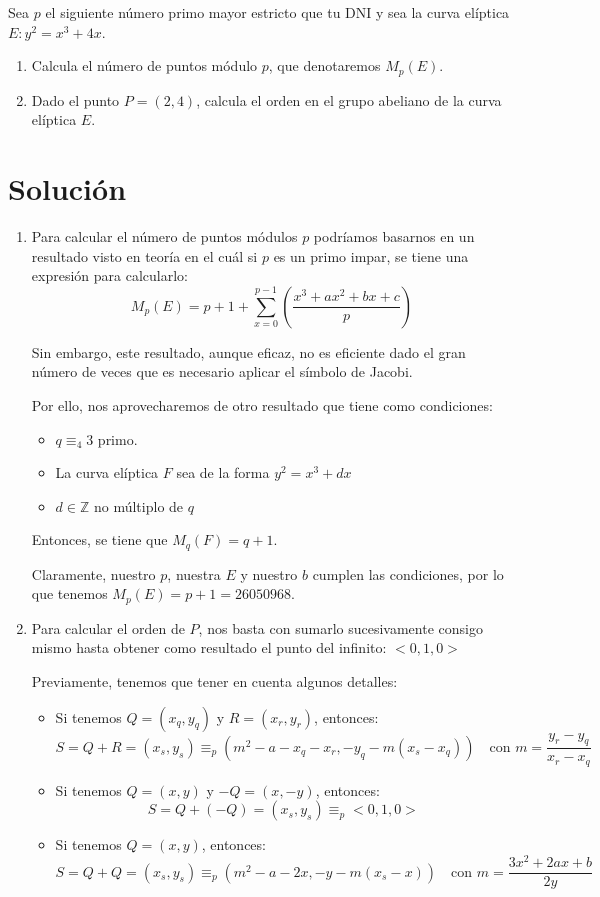 	Sea $p$ el siguiente número primo mayor estricto que tu DNI y sea la curva elíptica $E: y^2 = x^3 + 4x$.
	\begin{enumerate}
		\item Calcula el número de puntos módulo $p$, que denotaremos $M_p(E)$.
		\item Dado el punto $P = (2,4)$, calcula el orden en el grupo abeliano de la curva elíptica $E$.
	\end{enumerate}
	
\section*{Solución}
	\begin{enumerate}
		\item Para calcular el número de puntos módulos $p$ podríamos basarnos en un resultado visto en teoría
		en el cuál si $p$ es un primo impar, se tiene una expresión para calcularlo:
		$$\displaystyle M_p(E) = p + 1 + \sum_{x=0}^{p-1} \left( \frac{x^3 + ax^2 + bx + c}{p} \right)$$
		
		Sin embargo, este resultado, aunque eficaz, no es eficiente dado el gran número de veces que es necesario
		aplicar el símbolo de Jacobi.
		
		Por ello, nos aprovecharemos de otro resultado que tiene como condiciones:
		\begin{itemize}
			\item $q \equiv_4 3$ primo.
			\item La curva elíptica $F$ sea de la forma $y^2 = x^3 + dx$
			\item $d \in \mathbb{Z}$ no múltiplo de $q$
		\end{itemize}
		Entonces, se tiene que $M_q(F) = q+1$.

		Claramente, nuestro $p$, nuestra $E$ y nuestro $b$ cumplen las condiciones, por lo que tenemos $M_p(E)
		= p+1 = 26050968$.
		
		\item Para calcular el orden de $P$, nos basta con sumarlo sucesivamente consigo mismo hasta obtener
		como resultado el punto del infinito: $<0, 1, 0>$
		
		Previamente, tenemos que tener en cuenta algunos detalles:
		\begin{itemize}
			\item Si tenemos $Q = (x_q, y_q)$ y $R = (x_r, y_r)$, entonces:
			$$S = Q + R = (x_s, y_s) \equiv_p (m^2 - a - x_q - x_r, -y_q - m(x_s - x_q)) \quad \text{con }
			m=\frac{y_r - y_q}{x_r - x_q}$$
			\item Si tenemos $Q = (x, y)$ y $-Q = (x, -y)$, entonces:
			$$S = Q + (-Q) = (x_s, y_s) \equiv_p <0, 1, 0>$$
			\item Si tenemos $Q = (x, y)$, entonces:
			$$S = Q + Q = (x_s, y_s) \equiv_p (m^2 - a - 2x, -y - m(x_s - x)) \quad \text{con }
			m=\frac{3x^2 + 2ax + b}{2y}$$
		\end{itemize}
		

\end{enumerate}
